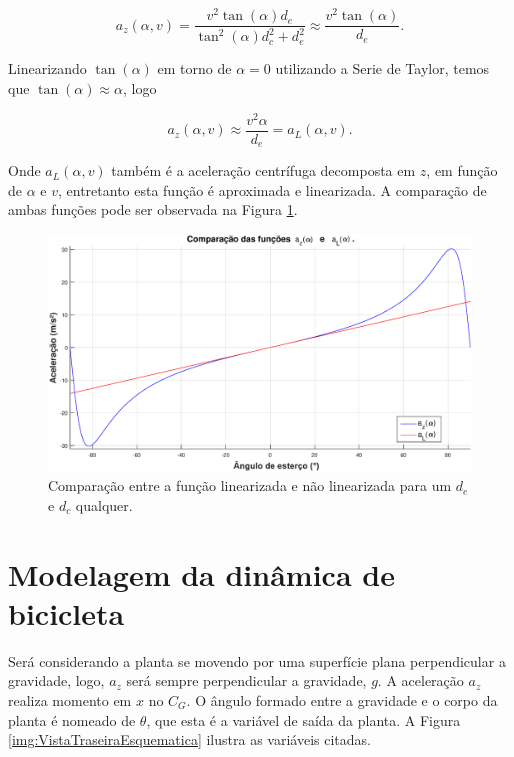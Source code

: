         \begin{equation}
            a_z(\alpha, v) = \frac{v^2\tan(\alpha)d_e}{\tan^2(\alpha)d_c^2+d_e^2} \approx \frac{v^2\tan(\alpha)}{d_e}.
            \label{eq:azdoidão}
        \end{equation}
        
        Linearizando $\tan(\alpha)$ em torno de $\alpha = 0$ utilizando a Serie de Taylor, temos que $\tan(\alpha) \approx \alpha$, logo
        
        \begin{equation}
           a_z(\alpha, v) \approx \frac{v^2\alpha}{d_e} = a_L(\alpha, v).
           \label{eq:LinearizaçãoAlpha}
        \end{equation}
        
        Onde $a_L(\alpha, v)$ também é a aceleração centrífuga decomposta em $z$, em função de $\alpha$ e $v$, entretanto esta função é aproximada e linearizada. A comparação de ambas funções pode ser observada na Figura \ref{img:comparativolinearização}.

		\begin{figure}[H]
            \centering
            \includegraphics[width=12cm]{Imagens/ComparativoLinearizacao.eps}
            \caption{Comparação entre a função linearizada e não linearizada para um $d_e$ e $d_c$ qualquer.}
            \label{img:comparativolinearização}
        \end{figure}
            
	\section{Modelagem da dinâmica de bicicleta}
        
        Será considerando a planta se movendo por uma superfície plana perpendicular a gravidade, logo, $a_z$ será sempre perpendicular a gravidade, $g$. A aceleração $a_z$ realiza momento em $x$ no $C_G$. O ângulo formado entre a gravidade e o corpo da planta é nomeado de $\theta$, que esta é a variável de saída da planta. A Figura \ref{img:VistaTraseiraEsquematica} ilustra as variáveis citadas.
        
